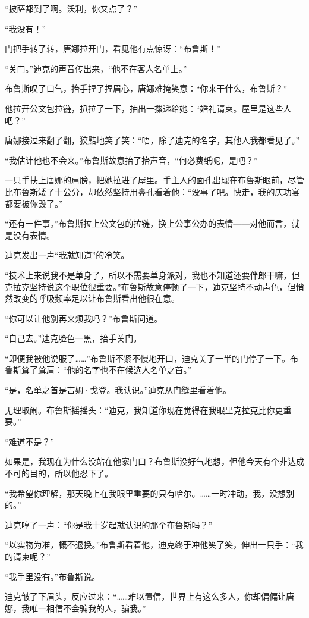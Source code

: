 \documentclass[../main]{subfiles}
\begin{document}
“披萨都到了啊。沃利，你又点了？”

“我没有！”

门把手转了转，唐娜拉开门，看见他有点惊讶：“布鲁斯！”

“关门。”迪克的声音传出来，“他不在客人名单上。”

布鲁斯叹了口气，抬手捏了捏眉心，唐娜难掩笑意：“你来干什么，布鲁斯？”

他拉开公文包拉链，扒拉了一下，抽出一摞递给她：“婚礼请柬。屋里是这些人吧？”

唐娜接过来翻了翻，狡黠地笑了笑：“唔，除了迪克的名字，其他人我都看见了。”

“我估计他也不会来。”布鲁斯故意抬了抬声音，“何必费纸呢，是吧？”

一只手扶上唐娜的肩膀，把她拉进了屋里。手主人的面孔出现在布鲁斯眼前，尽管比布鲁斯矮了十公分，却依然坚持用鼻孔看着他：“没事了吧。快走，我的庆功宴都要被你毁了。”

“还有一件事。”布鲁斯拉上公文包的拉链，换上公事公办的表情——对他而言，就是没有表情。

迪克发出一声“我就知道”的冷笑。

“技术上来说我不是单身了，所以不需要单身派对，我也不知道还要伴郎干嘛，但克拉克坚持说这个职位很重要。”布鲁斯故意停顿了一下，迪克坚持不动声色，但悄然改变的呼吸频率足以让布鲁斯看出他很在意。

“你可以让他别再来烦我吗？”布鲁斯问道。

“自己去。”迪克脸色一黑，抬手关门。

“即便我被他说服了……”布鲁斯不紧不慢地开口，迪克关了一半的门停了一下。布鲁斯耸了耸肩：“他的名字也不在候选人名单之首。”

“是，名单之首是吉姆·戈登。我认识。”迪克从门缝里看着他。

无理取闹。布鲁斯摇摇头：“迪克，我知道你现在觉得在我眼里克拉克比你更重要。”

“难道不是？”

如果是，我现在为什么没站在他家门口？布鲁斯没好气地想，但他今天有个非达成不可的目的，所以他忍下了。

“我希望你理解，那天晚上在我眼里重要的只有哈尔。……一时冲动，我，没想别的。”

迪克哼了一声：“你是我十岁起就认识的那个布鲁斯吗？”

“以实物为准，概不退换。”布鲁斯看着他，迪克终于冲他笑了笑，伸出一只手：“我的请柬呢？”

“我手里没有。”布鲁斯说。

迪克皱了下眉头，反应过来：“……难以置信，世界上有这么多人，你却偏偏让唐娜，我唯一相信不会骗我的人，骗我。”
\end{document}
